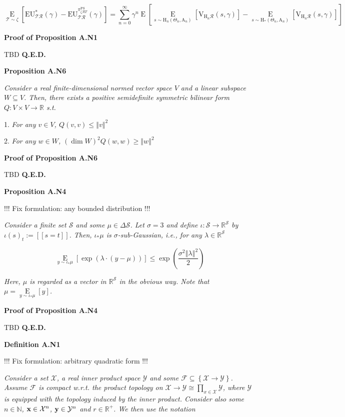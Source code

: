 \documentclass[a4paper]{article}
\newcommand{\Co}[1]{}
\newcommand{\AP}[1]{\left(#1\right)}
\newcommand{\AB}[1]{\left[#1\right]}
\newcommand{\AC}[1]{\left\{#1\right\}}
\newcommand{\Ea}[2]{\underset{#1}{\operatorname{E}}\AB{#2}}
\newcommand{\Nats}{\mathbb{N}}
\newcommand{\Reals}{\mathbb{R}}
\newcommand{\Norm}[1]{\left\Vert #1 \right\Vert}
\newcommand{\X}{\mathcal{X}}
\newcommand{\Y}{\mathcal{Y}}
\newcommand{\F}{\mathcal{F}}
\newcommand{\St}{\mathcal{S}}
\newcommand{\R}{\mathcal{R}}
\newcommand{\T}{\mathcal{T}}
\newcommand{\V}{\mathrm{V}}
\newcommand{\EU}{\mathrm{EU}}
\newcommand{\PSR}{\text{PS}}
\newcommand{\AT}{\mathrm{A}}
\newcommand{\THy}{\mathrm{H}_*}
\newcommand{\SHy}{\mathrm{H}}
\begin{document}
$$\Ea{\T\sim\zeta}{\EU^*_{\T\R}(\gamma)-\EU^{\pi_{\zeta\R T}^{\PSR}}_{\T\R}(\gamma)}=\sum_{n=0}^\infty\gamma^{n}\Ea{}{\Ea{s\sim \SHy_n\AP{\Theta_n,\AT_n}}{\V_{\SHy_n\R}(s,\gamma)}-\Ea{s\sim \THy\AP{\Theta_n,\AT_n}}{\V_{\SHy_n\R}(s,\gamma)}}$$

\textbf{Proof of Proposition A.N1}\Co{b}


TBD \textbf{Q.E.D.}\Co{b}

\textbf{Proposition A.N6}\Co{b}

\textit{Consider a real finite-dimensional normed vector space $V$ and a linear subspace $W\subseteq V$. Then, there exists a positive semidefinite symmetric bilinear form $Q: V \times V \rightarrow \Reals$ s.t.}\Co{i}

1. \textit{For any $v\in V$, $Q(v,v)\leq\Norm{v}^2$}\Co{i}

2. \textit{For any $w\in W$, $\AP{\dim{W}}^2 Q(w,w)\geq \Norm{w}^2$}\Co{i}

\textbf{Proof of Proposition A.N6}\Co{b}

TBD \textbf{Q.E.D.}\Co{b}

\textbf{Proposition A.N4}\Co{b}

!!! Fix formulation: any bounded distribution !!!

\textit{Consider a finite set $\St$ and some $\mu\in\Delta\St$. Let $\sigma=3$ and define $\iota:\St\rightarrow\Reals^\St$ by $\iota(s)_t:=[[s=t]]$. Then, $\iota_*\mu$ is $\sigma$-sub-Gaussian, i.e., for any $\lambda\in\Reals^\St$}\Co{i}

$$\Ea{y\sim\iota_*\mu}{\exp\AP{\lambda\cdot\AP{y-\mu}}} \leq \exp\AP{\frac{\sigma^2\Norm{\lambda}^2}{2}}$$

\textit{Here, $\mu$ is regarded as a vector in $\Reals^\St$ in the obvious way. Note that $\mu=\Ea{y\sim\iota_*\mu}{y}$.}\Co{i}

\textbf{Proof of Proposition A.N4}\Co{b}

TBD \textbf{Q.E.D.}\Co{b}

\textbf{Definition A.N1}\Co{b}

!!! Fix formulation: arbitrary quadratic form !!!

\textit{Consider a set $\X$, a real inner product space $\Y$ and some $\F\subseteq\AC{\X\rightarrow\Y}$. Assume $\F$ is compact w.r.t. the product topology on $\X\rightarrow\Y\cong\prod_{x\in\X}\Y$, where $\Y$ is equipped with the topology induced by the inner product. Consider also some $n\in\Nats$, $\bold{x}\in\X^n$, $\bold{y}\in\Y^n$ and $r\in\Reals^+$. We then use the notation}\Co{i}
\end{document}
